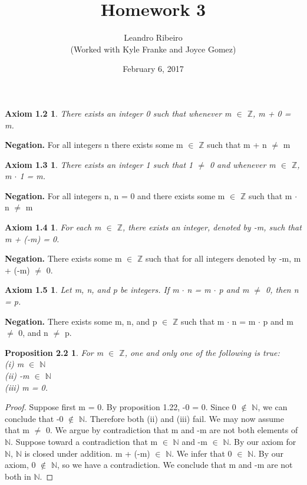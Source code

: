 \documentclass[12pt]{amsart}
\newcommand{\N}{\mathbb{N}}
\newcommand{\Z}{\mathbb{Z}}
\begin{document}
\title{Homework 3}
\date{February 6, 2017}
\author{Leandro Ribeiro\\(Worked with Kyle Franke and Joyce Gomez)}

\maketitle

\theoremstyle{plain}
\newtheorem*{axiom1.2}{Axiom 1.2}
\begin{axiom1.2}
There exists an integer 0 such that whenever m $\in$ $\Z$, m + 0 = m.
\end{axiom1.2}

\noindent
\textbf{Negation.} For all integers n there exists some m $\in$ $\Z$ such that m + n $\neq$ m

\newtheorem*{axiom1.3}{Axiom 1.3}
\begin{axiom1.3}
There exists an integer 1 such that 1 $\neq$ 0 and whenever m $\in$ $\Z$, m $\cdot$ 1 = m.
\end{axiom1.3}

\noindent
\textbf{Negation.} For all integers n, n = 0 and there exists some m $\in$ $\Z$ such that m $\cdot$ n $\neq$ m

\newtheorem*{axiom1.4}{Axiom 1.4}
\begin{axiom1.4}
For each m $\in$ $\Z$, there exists an integer, denoted by -m, such that m + (-m) = 0.
\end{axiom1.4}

\noindent
\textbf{Negation.} There exists some m $\in$ $\Z$ such that for all integers denoted by -m, m + (-m) $\neq$ 0.

\newtheorem*{axiom1.5}{Axiom 1.5}
\begin{axiom1.5}
Let m, n, and p be integers. If m $\cdot$ n = m $\cdot$ p and m $\neq$ 0, then n = p.
\end{axiom1.5}

\noindent
\textbf{Negation.} There exists some m, n, and p $\in$ $\Z$ such that m $\cdot$ n = m $\cdot$ p and m $\neq$ 0, and n $\neq$ p.

\newtheorem*{prop2.2}{Proposition 2.2}
\begin{prop2.2}
For m $\in$ $\Z$, one and only one of the following is true: 
\\(i) m $\in$ $\N$
\\(ii) -m $\in$ $\N$
\\(iii) m = 0.
\end{prop2.2}

\begin{proof}
Suppose first m = 0. By proposition 1.22, -0 = 0. Since 0 $\notin$ $\N$, we can conclude that -0 $\notin$ $\N$. Therefore both (ii) and (iii) fail. We may now assume that m $\neq$ 0. We argue by contradiction that m and -m are not both elements of $\N$. Suppose toward a  contradiction that m $\in$ $\N$ and -m $\in$ $\N$. By our axiom for $\N$, $\N$ is closed under addition. m + (-m) $\in$ $\N$. We infer that 0 $\in$ $\N$. By our axiom, 0 $\notin$ $\N$, so we have a contradiction. We conclude that m and -m are not both in $\N$.
\end{proof}
\end{document}
